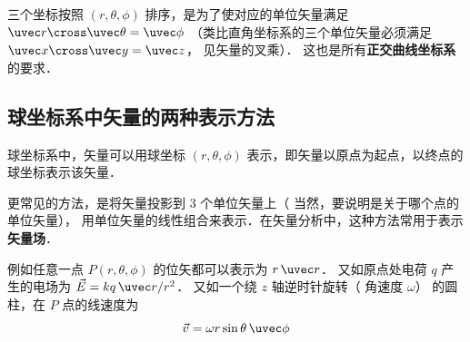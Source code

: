 三个坐标按照 $(r,\theta ,\phi )$ 排序，是为了使对应的单位矢量满足 $\uvec r \cross \uvec \theta  = \uvec \phi $ （类比直角坐标系的三个单位矢量必须满足 $\uvec x \cross \uvec y = \uvec z$， 见矢量的叉乘）． 这也是所有\textbf{正交曲线坐标系}%
 的要求．
 
\subsection{球坐标系中矢量的两种表示方法}
球坐标系中，矢量可以用球坐标 $(r,\theta,\phi)$ 表示，即矢量以原点为起点，以终点的球坐标表示该矢量．

更常见的方法，是将矢量投影到 3 个单位矢量上（ 当然，要说明是关于哪个点的单位矢量）， 用单位矢量的线性组合来表示．在矢量分析中，这种方法常用于表示\textbf{矢量场}．%

例如任意一点 $P(r,\theta ,\phi)$ 的位矢都可以表示为 $r\,\uvec r$． 又如原点处电荷 $q$ 产生的电场为 $\vec E = k q \,\uvec r/r^2$． 又如一个绕 $z$ 轴逆时针旋转（ 角速度 $\omega $） 的圆柱，在 $P$ 点的线速度为
\begin{equation}
\vec v = \omega r\sin \theta \,\uvec \phi 
\end{equation}









